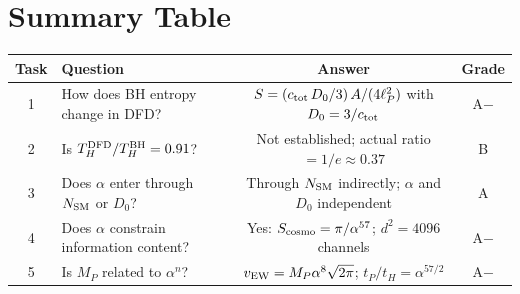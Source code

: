 \documentclass[11pt,a4paper]{article}
\begin{document}
\section{Summary Table}
\label{sec:final-summary}

\begin{center}
\renewcommand{\arraystretch}{1.3}
\begin{tabular}{clcc}
\toprule
\textbf{Task} & \textbf{Question} & \textbf{Answer} & \textbf{Grade} \\
\midrule
1 & How does BH entropy change in DFD? & $S = (c_{\rm tot}\,D_0/3)\,A/(4\ell_P^2)$ with $D_0 = 3/c_{\rm tot}$ & A$-$ \\
2 & Is $T_H^{\rm DFD}/T_H^{\rm BH} = 0.91$? & Not established; actual ratio $= 1/e \approx 0.37$ & B \\
3 & Does $\alpha$ enter through $N_{\rm SM}$ or $D_0$? & Through $N_{\rm SM}$ indirectly; $\alpha$ and $D_0$ independent & A \\
4 & Does $\alpha$ constrain information content? & Yes: $S_{\rm cosmo} = \pi/\alpha^{57}$; $d^2 = 4096$ channels & A$-$ \\
5 & Is $M_P$ related to $\alpha^n$? & $v_{\rm EW} = M_P\alpha^8\sqrt{2\pi}$; $t_P/t_H = \alpha^{57/2}$ & A$-$ \\
\bottomrule
\end{tabular}
\end{center}
\end{document}
